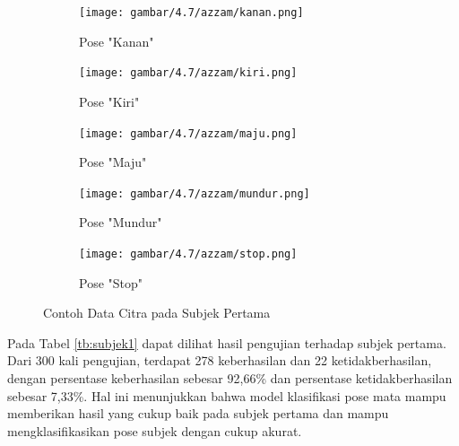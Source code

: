 \begin{figure}[H]
  \centering
  \begin{subfigure}[b]{0.329\linewidth}
      \texttt{[image: gambar/4.7/azzam/kanan.png]}
      \caption{Pose "Kanan"}
      \label{fig:azzam1}
  \end{subfigure}
  \hfill %
  \begin{subfigure}[b]{0.329\linewidth}
    \texttt{[image: gambar/4.7/azzam/kiri.png]}
    \caption{Pose "Kiri"}
    \label{fig:azzam2}
  \end{subfigure}
  \vspace{1cm} %
  \begin{subfigure}[b]{0.329\linewidth}
    \texttt{[image: gambar/4.7/azzam/maju.png]}
    \caption{Pose "Maju"}
    \label{fig:azzam3}
  \end{subfigure}
  \begin{subfigure}[b]{0.32\linewidth}
    \texttt{[image: gambar/4.7/azzam/mundur.png]}
    \caption{Pose "Mundur"}
    \label{fig:azzam4}
  \end{subfigure}
  \begin{subfigure}[b]{0.32\linewidth}
    \texttt{[image: gambar/4.7/azzam/stop.png]}
    \caption{Pose "Stop"}
    \label{fig:azzam5}
  \end{subfigure}
  \caption{Contoh Data Citra pada Subjek Pertama}
  \label{fig:subjek1}
\end{figure}

Pada Tabel \ref{tb:subjek1} dapat dilihat hasil pengujian terhadap subjek pertama. Dari 300 kali pengujian, terdapat 278 keberhasilan dan 22 ketidakberhasilan, dengan persentase keberhasilan sebesar 92,66\% dan persentase ketidakberhasilan sebesar 7,33\%. Hal ini menunjukkan bahwa model klasifikasi pose mata mampu memberikan hasil yang cukup baik pada subjek pertama dan mampu mengklasifikasikan pose subjek dengan cukup akurat.

